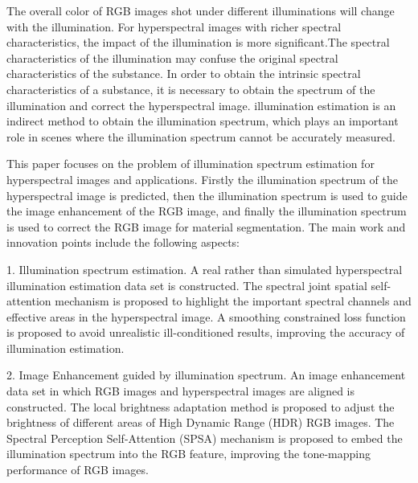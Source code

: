 \documentclass[
    type = master, %
    degree = academic,        %
    decl-page,  %
  ]{njuthesis}
\begin{document}
\begin{abstract*}


The overall color of RGB images shot under different illuminations will change with the illumination. For hyperspectral images with richer spectral characteristics, the impact of the illumination is more significant.The spectral characteristics of the illumination may confuse the original spectral characteristics of the substance. In order to obtain the intrinsic spectral characteristics of a substance, it is necessary to obtain the spectrum of the illumination and correct the hyperspectral image. illumination estimation is an indirect method to obtain the illumination spectrum, which plays an important role in scenes where the illumination spectrum cannot be accurately measured.

This paper focuses on the problem of illumination spectrum estimation for hyperspectral images and applications. Firstly the illumination spectrum of the hyperspectral image is predicted, then the illumination spectrum is used to guide the image enhancement of the RGB image, and finally the illumination spectrum is used to correct the RGB image for material segmentation. The main work and innovation points include the following aspects:

1. Illumination spectrum estimation. A real rather than simulated hyperspectral illumination estimation data set is constructed. The spectral joint spatial self-attention mechanism is proposed to highlight the important spectral channels and effective areas in the hyperspectral image. A smoothing constrained loss function is proposed to avoid unrealistic ill-conditioned results, improving the accuracy of illumination estimation.

2. Image Enhancement guided by illumination spectrum. An image enhancement data set in which RGB images and hyperspectral images are aligned is constructed. The local brightness adaptation method is proposed to adjust the brightness of different areas of High Dynamic Range (HDR) RGB images. The Spectral Perception Self-Attention (SPSA) mechanism is proposed to embed the illumination spectrum into the RGB feature, improving the tone-mapping performance of RGB images.


\end{abstract*}
\end{document}
